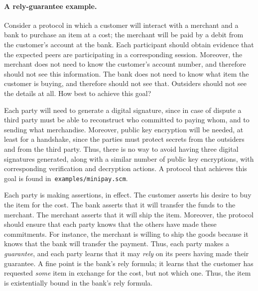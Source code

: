 \paragraph{A rely-guarantee example.}  Consider a protocol in which a
customer will interact with a merchant and a bank to purchase an item
at a cost; the merchant will be paid by a debit from the customer's
account at the bank.  Each participant should obtain evidence that the
expected peers are participating in a corresponding session.
Moreover, the merchant does not need to know the customer's account
number, and therefore should not see this information.  The bank does
not need to know what item the customer is buying, and therefore
should not see that.  Outsiders should not see the details at all.
How best to achieve this goal?

Each party will need to generate a digital signature, since in case of
dispute a third party must be able to reconstruct who committed to
paying whom, and to sending what merchandise.  Moreover, public key
encryption will be needed, at least for a handshake, since the parties
must protect secrets from the outsiders and from the third party.
Thus, there is no way to avoid having three digital signatures
generated, along with a similar number of public key encryptions, with
corresponding verification and decryption actions.  A protocol that
achieves this goal is found in~\texttt{examples/minipay.scm}.

Each party is making assertions, in effect.  The customer asserts his
desire to buy the item for the cost.  The bank asserts that it will
transfer the funds to the merchant.  The merchant asserts that it will
ship the item.  Moreover, the protocol should ensure that each party
knows that the others have made these commitments.  For instance, the
merchant is willing to ship the goods because it knows that the bank
will transfer the payment.  Thus, each party makes a \emph{guarantee},
and each party learns that it may \emph{rely} on its peers having made
their guarantee.  A fine point is the bank's rely formula; it learns
that the customer has requested \emph{some} item in exchange for the
cost, but not which one.  Thus, the item is existentially bound in the
bank's rely formula.

